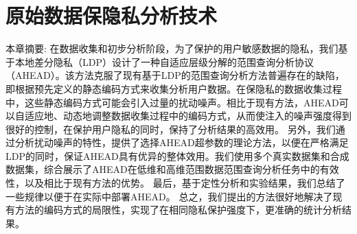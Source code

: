 



\chapter{原始数据保隐私分析技术}
本章摘要: 
在数据收集和初步分析阶段，为了保护的用户敏感数据的隐私，我们基于本地差分隐私（LDP）设计了一种自适应层级分解的范围查询分析协议（AHEAD）。该方法克服了现有基于LDP的范围查询分析方法普遍存在的缺陷，即根据预先定义的静态编码方式来收集分析用户数据。在保隐私的数据收集过程中，这些静态编码方式可能会引入过量的扰动噪声。相比于现有方法，AHEAD可以自适应地、动态地调整数据收集过程中的编码方式，从而使注入的噪声强度得到很好的控制，在保护用户隐私的同时，保持了分析结果的高效用。
另外，我们通过分析扰动噪声的特性，提供了选择AHEAD超参数的理论方法，以便在严格满足LDP的同时，保证AHEAD具有优异的整体效用。我们使用多个真实数据集和合成数据集，综合展示了AHEAD在低维和高维范围数据范围查询分析任务中的有效性，以及相比于现有方法的优势。
最后，基于定性分析和实验结果，我们总结了一些规律以便于在实际中部署AHEAD。
总之，我们提出的方法很好地解决了现有方法的编码方式的局限性，实现了在相同隐私保护强度下，更准确的统计分析结果。

